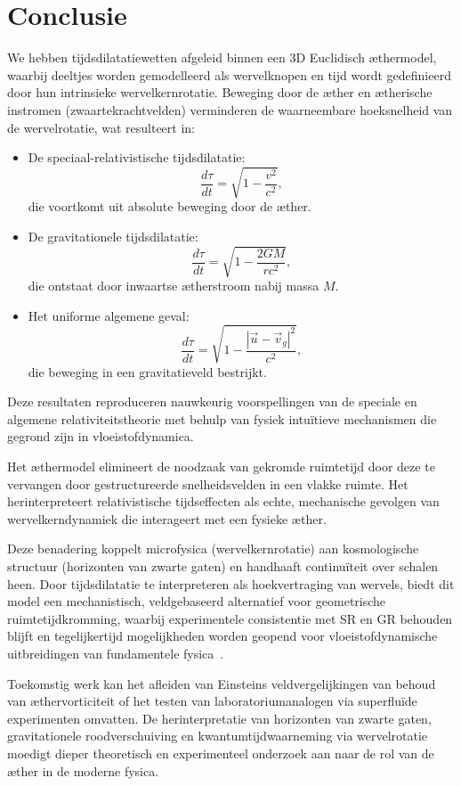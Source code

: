 \section{Conclusie}

We hebben tijdsdilatatiewetten afgeleid binnen een 3D Euclidisch æthermodel, waarbij deeltjes worden gemodelleerd als wervelknopen en tijd wordt gedefinieerd door hun intrinsieke wervelkernrotatie. Beweging door de æther en ætherische instromen (zwaartekrachtvelden) verminderen de waarneembare hoeksnelheid van de wervelrotatie, wat resulteert in:

\begin{itemize}
    \item De speciaal-relativistische tijdsdilatatie:
    \[
        \frac{d\tau}{dt} = \sqrt{1 - \frac{v^2}{c^2}},
    \]
    die voortkomt uit absolute beweging door de æther.

    \item De gravitationele tijdsdilatatie:
    \[
        \frac{d\tau}{dt} = \sqrt{1 - \frac{2GM}{rc^2}},
    \]
    die ontstaat door inwaartse ætherstroom nabij massa $M$.

    \item Het uniforme algemene geval:
    \[
        \frac{d\tau}{dt} = \sqrt{1 - \frac{|\vec{u} - \vec{v}_g|^2}{c^2}},
    \]
    die beweging in een gravitatieveld bestrijkt.
\end{itemize}

Deze resultaten reproduceren nauwkeurig voorspellingen van de speciale en algemene relativiteitstheorie met behulp van fysiek intuïtieve mechanismen die gegrond zijn in vloeistofdynamica.

Het æthermodel elimineert de noodzaak van gekromde ruimtetijd door deze te vervangen door gestructureerde snelheidsvelden in een vlakke ruimte. Het herinterpreteert relativistische tijdseffecten als echte, mechanische gevolgen van wervelkerndynamiek die interageert met een fysieke æther.

Deze benadering koppelt microfysica (wervelkernrotatie) aan kosmologische structuur (horizonten van zwarte gaten) en handhaaft continuïteit over schalen heen. Door tijdsdilatatie te interpreteren als hoekvertraging van wervels, biedt dit model een mechanistisch, veldgebaseerd alternatief voor geometrische ruimtetijdkromming, waarbij experimentele consistentie met SR en GR behouden blijft en tegelijkertijd mogelijkheden worden geopend voor vloeistofdynamische uitbreidingen van fundamentele fysica~\cite{Winterberg2002-PlanckAether,Schiller2022-maxforce}.

Toekomstig werk kan het afleiden van Einsteins veldvergelijkingen van behoud van æthervorticiteit of het testen van laboratoriumanalogen via superfluïde experimenten omvatten. De herinterpretatie van horizonten van zwarte gaten, gravitationele roodverschuiving en kwantumtijdwaarneming via wervelrotatie moedigt dieper theoretisch en experimenteel onderzoek aan naar de rol van de æther in de moderne fysica.